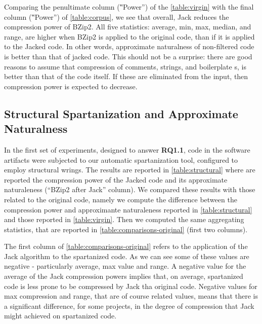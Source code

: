 Comparing the penultimate column (‟Power”) of the \cref{table:virgin}
with the final column (‟Power”) of
\cref{table:corpus}, we see that overall, Jack reduces the compression power of
BZip2. All five statistics: average, min, max, median, and range, are higher
when BZip2 is applied to the original code, than if it is applied to the Jacked
code. In other words, approximate naturalness of non-filtered code is better
than that of jacked code. This should not be a surprise: there are good reasons
to assume that compression of comments, strings, and boilerplate s,
is better than that of the code itself. If these are eliminated from the input,
then compression power is expected to decrease.

\subsection{Structural Spartanization and Approximate Naturalness}

In the first set of experiments, designed to answer \textbf{RQ1.1}, \Java code
in the software artifacts were subjected to our automatic spartanization
tool, configured to employ structural wrings.
The results are reported in \cref{table:structural} where are reported
the compression power of the Jacked code and its approximate
naturaleness (``BZip2 after Jack'' column).
We compared these results %
with those related to the original code, namely we compute the difference 
between the compression power and approximante naturaleness reported in \cref{table:structural}
and those reported in \cref{table:virgin}.
Then we computed the same aggregating statistics, that are reported in 
\cref{table:comparisons-original} (first two columns).

The first column of \cref{table:comparisons-original} refers to the application of the Jack
algorithm to the spartanized code. As we can see some of these values are negative - particularly 
average, max value and range. 
A negative value for the average of the Jack compression powers implies that, 
on average, spartanized code is less prone to be compressed by Jack tha original code. 
Negative values for max compression and range, that are of course related values, means
that there is a significant difference, for some projects, in the degree of compression
that Jack might achieved on spartanized code. 

